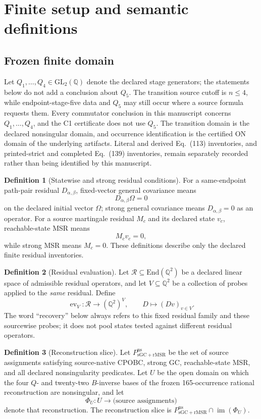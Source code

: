 \documentclass[11pt]{article}
\theoremstyle{definition}
\newtheorem{definition}{Definition}
\theoremstyle{remark}
\newcommand{\QQ}{\mathbb{Q}}
\newcommand{\GL}{\mathrm{GL}}
\newcommand{\End}{\mathrm{End}}
\newcommand{\im}{\operatorname{im}}
\begin{document}
\section{Finite setup and semantic definitions}

\subsection{Frozen finite domain}

Let \(Q_1,\ldots,Q_4\in\GL_2(\QQ)\) denote the declared stage generators;
the statements below do not add a conclusion about \(Q_5\).  The transition
source cutoff is \(n\leq4\), while endpoint-stage-five data and \(Q_5\) may
still occur where a source formula requests them.  Every commutator conclusion
in this manuscript concerns \(Q_1,\ldots,Q_4\), and the C1 certificate does
not use \(Q_5\).  The transition domain is the declared nonsingular domain,
and occurrence identification is the certified ON domain of the underlying
artifacts.  Literal and derived Eq.~(113) inventories, and printed-strict and
completed Eq.~(139) inventories, remain separately recorded rather than
being identified by this manuscript.

\begin{definition}[Statewise and strong residual conditions]
For a same-endpoint path-pair residual \(D_{\alpha,\beta}\), fixed-vector
general covariance means
\[
  D_{\alpha,\beta}\Omega=0
\]
on the declared initial vector \(\Omega\); strong general covariance means
\(D_{\alpha,\beta}=0\) as an operator.  For a source martingale residual
\(M_c\) and its declared state \(v_c\), reachable-state MSR means
\[
  M_cv_c=0,
\]
while strong MSR means \(M_c=0\).  These definitions describe only the
declared finite residual inventories.
\end{definition}

\begin{definition}[Residual evaluation]
Let \(\mathcal R\subseteq\End(\QQ^2)\) be a declared linear space of
admissible residual operators, and let \(V\subseteq\QQ^2\) be a collection
of probes applied to the \emph{same} residual.  Define
\[
  \operatorname{ev}_V:\mathcal R\longrightarrow(\QQ^2)^V,
  \qquad D\longmapsto(Dv)_{v\in V}.
\]
The word ``recovery'' below always refers to this fixed residual family and
these sourcewise probes; it does not pool states tested against different
residual operators.
\end{definition}

\begin{definition}[Reconstruction slice]
Let
\(P_{\mathrm{sGC+rMSR}}^{\mathrm{ns}}\) be the set of source assignments
satisfying source-native CPOBC, strong GC, reachable-state MSR, and all
declared nonsingularity predicates.  Let \(U\) be the open domain on which
the four \(Q\)- and twenty-two \(B\)-inverse bases of the frozen
165-occurrence rational reconstruction are nonsingular, and let
\[
  \Phi_U:U\longrightarrow\text{(source assignments)}
\]
denote that reconstruction.  The reconstruction slice is
\(P_{\mathrm{sGC+rMSR}}^{\mathrm{ns}}\cap\im(\Phi_U)\).
\end{definition}
\end{document}
